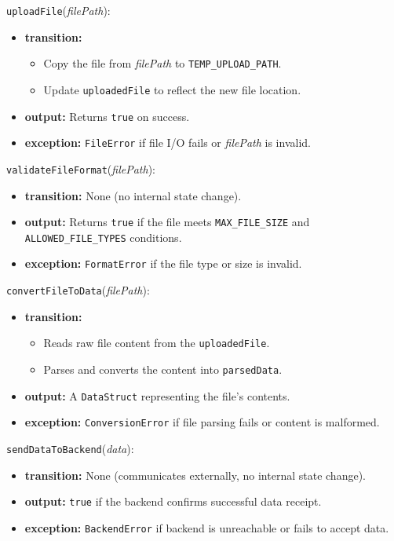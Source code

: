 \documentclass[12pt, titlepage]{article}
\begin{document}
\noindent \texttt{uploadFile}(\textit{filePath}):
\begin{itemize}
    \item \textbf{transition:} 
    \begin{itemize}
        \item Copy the file from \textit{filePath} to \texttt{TEMP\_UPLOAD\_PATH}.
        \item Update \texttt{uploadedFile} to reflect the new file location.
    \end{itemize}
    \item \textbf{output:} Returns \texttt{true} on success.
    \item \textbf{exception:} \texttt{FileError} if file I/O fails or \textit{filePath} is invalid.
\end{itemize}

\noindent \texttt{validateFileFormat}(\textit{filePath}):
\begin{itemize}
    \item \textbf{transition:} None (no internal state change).
    \item \textbf{output:} Returns \texttt{true} if the file meets \texttt{MAX\_FILE\_SIZE} and 
    \texttt{ALLOWED\_FILE\_TYPES} conditions.
    \item \textbf{exception:} \texttt{FormatError} if the file type or size is invalid.
\end{itemize}

\noindent \texttt{convertFileToData}(\textit{filePath}):
\begin{itemize}
    \item \textbf{transition:}
    \begin{itemize}
        \item Reads raw file content from the \texttt{uploadedFile}.
        \item Parses and converts the content into \texttt{parsedData}.
    \end{itemize}
    \item \textbf{output:} A \texttt{DataStruct} representing the file’s contents.
    \item \textbf{exception:} \texttt{ConversionError} if file parsing fails or content is malformed.
\end{itemize}

\noindent \texttt{sendDataToBackend}(\textit{data}):
\begin{itemize}
    \item \textbf{transition:} None (communicates externally, no internal state change).
    \item \textbf{output:} \texttt{true} if the backend confirms successful data receipt.
    \item \textbf{exception:} \texttt{BackendError} if backend is unreachable or fails to accept data.
\end{itemize}
\end{document}
